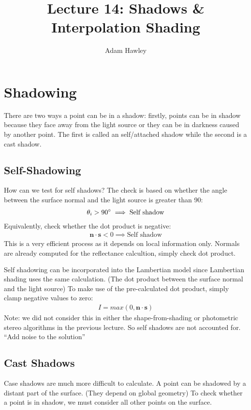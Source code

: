 \documentclass{article}
\author{Adam Hawley}
\title{Lecture 14: Shadows \& Interpolation Shading}
\begin{document}
\maketitle

\section{Shadowing}
There are two ways a point can be in a shadow:
firstly, points can be in shadow because they face away from the light source or they can be in darkness caused by another point.
The first is called an self/attached shadow while the second is a cast shadow.

\subsection{Self-Shadowing}
How can we test for self shadows?
The check is based on whether the angle between the surface normal and the light source is greater than 90\degree:
\begin{align*}
	\theta_i > 90\degree \implies \text{Self shadow}
\end{align*}
Equivalently, check whether the dot product is negative:
\begin{align*}
	\textbf{n}\cdot\textbf{s}<0 \implies \text{Self shadow}
\end{align*}
This is a very efficient process as it depends on local information only.
Normals are already computed for the reflectance calcultion, simply check dot product.

Self shadowing can be incorporated into the Lambertian model since Lambertian shading uses the same calculation.
(The dot product between the surface normal and the light source)
To make use of the pre-calculated dot product, simply clamp negative values to zero:
\begin{align*}
	I = max(0,\textbf{n}\cdot\textbf{s})
\end{align*}
Note: we did not consider this in either the shape-from-shading or photometric stereo algorithms in the previous lecture.
So self shadows are not accounted for.
``Add noise to the solution'' %

\subsection{Cast Shadows}
Case shadows are much more difficult to calculate.
A point can be shadowed by a distant part of the surface.
(They depend on global geometry)
To check whether a point is in shadow, we must consider all other points on the surface.
\end{document}

